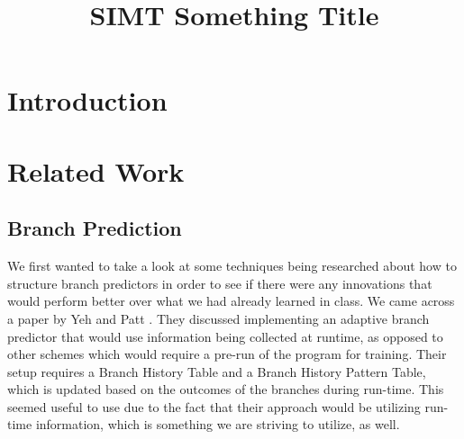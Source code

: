 \documentclass[conference]{IEEEtran}
\begin{document}
%
\title{SIMT Something Title}


\author{
\and{}
}

\maketitle


\begin{abstract} 

\end{abstract}

\IEEEpeerreviewmaketitle


\section{Introduction}



\section{Related Work}

\subsection{Branch Prediction}

We first wanted to take a look at some techniques being researched about how to structure branch predictors in order to see if there were any innovations that would perform better over what we had already learned in class.  We came across a paper by Yeh and Patt \cite{Yeh91}.  They discussed implementing an adaptive branch predictor that would use information being collected at runtime, as opposed to other schemes which would require a pre-run of the program for training.  Their setup requires a Branch History Table and a Branch History Pattern Table, which is updated based on the outcomes of the branches during run-time.  This seemed useful to use due to the fact that their approach would be utilizing run-time information, which is something we are striving to utilize, as well.
\end{document}
